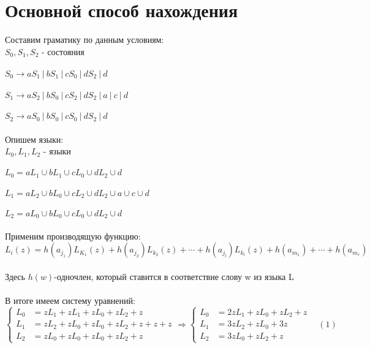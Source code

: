 \documentclass[a4paper,12pt]{article} %
\begin{document}
\section{Основной способ нахождения}
			{Составим граматику по данным условиям:}\\
			$S_0,S_1,S_2$ - состояния\\ \\
			$ S_0\rightarrow aS_1\:|\:bS_1\:|\:cS_0\:|\:dS_2\:|\:d $\\ \\ 
			$ S_1\rightarrow aS_2\:|\:bS_0\:|\:cS_2\:|\:dS_2\:|\:a\:|\:c\:|\:d$\\ \\
			$ S_2\rightarrow aS_0\:|\:bS_0\:|\:cS_0\:|\:dS_2\:|\:d $\\ \\
			{Опишем языки:}\\
			$ L_0,L_1,L_2 $ - языки\\ \\
			$L_0 = aL_1\cup bL_1 \cup cL_0 \cup dL_2 \cup d $\\ \\
			$L_1 = aL_2\cup bL_0 \cup cL_2 \cup dL_2 \cup a \cup c \cup d $\\ \\
			$L_2 = aL_0\cup bL_0 \cup cL_0 \cup dL_2 \cup d $\\ \\
			Применим производящую функцию: \\
			$L_i(z)=h(a_{j_1})L_{K_1}(z)+h(a_{j_2})L_{k_2}(z)+\cdots+h(a_{j_l})L_{k_l}(z)+h(a_{m_1})+\cdots+h(a_{m_r})$\\ \\
			Здесь $h(w)$-одночлен, который ставится в соответствие слову w из языка L
			\\ \\
			В итоге имеем систему уравнений:
			\[ \left\{
			\begin{aligned}
			L_0 & = zL_1 + zL_1 + zL_0 + zL_2 + z \\
			L_1 & = zL_2 + zL_0 + zL_0 + zL_2 + z + z + z \\
			L_2 & = zL_0 + zL_0 + zL_0 + zL_2 + z
			\end{aligned} \right.
			\Rightarrow 
			\left\{ \begin{aligned}
			L_0 & = 2zL_1 + zL_0 + zL_2 + z\\
			L_1 & = 3zL_2 + zL_0 + 3z\\
			L_2 & = 3zL_0 + zL_2 + z
			\end{aligned}  \right.
			\: \: \: \:(1)\]\\  
\end{document}
